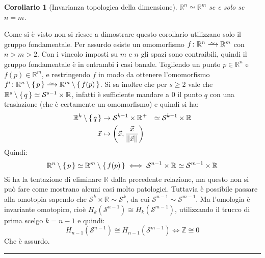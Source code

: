 \documentclass[10pt, twoside=false, x11names]{scrbook}
\newtheorem{corollary}[theorem]{Corollario}
\newenvironment{proof}{{\textbf{Dimostrazione}:}}{\hfill\rule{2mm}{2mm} \newline}
\newcommand{\Z}{\mathbb{Z}}
\newcommand{\RN}[1][]{\mathbb{R}^#1}
\newcommand{\Sph}[1][]{\mathcal{S}^#1}
\newcommand{\homoto}{\xrightarrow{\,\smash{\raisebox{-0.65ex}{\ensuremath{\scriptstyle\sim}}}\,}}
\begin{document}
\begin{corollary}[Invarianza topologica della dimensione]
  $ \RN{n} \simeq \RN{m} $ se e solo se $ n = m $.
\end{corollary}
Come si è visto non si riesce a dimostrare questo corollario
utilizzano solo il gruppo fondamentale.
\begin{proof}
  Per assurdo esiste un omomorfismo $ f \colon \RN{n} \homoto \RN{m} $ con $ n > m > 2 $.
  Con i vincolo imposti su $ m $ e $ n $ gli spazi sono contraibili, quindi il gruppo
  fondamentale è in entrambi i casi banale. Togliendo un punto $ p \in \RN{n} $ e
  $ f(p) \in \RN{m} $, e restringendo $ f $ in modo da ottenere l'omomorfismo
  $ f' \colon \RN{n} \setminus \set{p} \homoto \RN{m} \setminus \set{f(p)} $.
  Si sa inoltre che per $ s \geq 2 $ vale che $ \RN{s} \setminus \set{q} \simeq \Sph{s-1} \times \RN{} $,
  infatti è sufficiente mandare a $ 0 $ il punto $ q $ con una traslazione
  (che è certamente un omomorfismo) e quindi si ha:
  \[
    \begin{aligned}[t]
      \RN{k} \setminus \set{q} & \to  \Sph{k-1} \times {\RN{}}^+ & \simeq \Sph{k-1} \times \RN{} \\
      \vec{x} & \mapsto \left( \vec{x}, \frac{\vec{x}}{|| \vec{x} ||} \right) &
    \end{aligned}
  \]
  Quindi:
  \[
    \RN{n} \setminus \set{p} \simeq \RN{m} \setminus \set{f(p)} \iff \Sph{n-1} \times \RN{} \simeq \Sph{m-1} \times \RN{}
  \]
  Si ha la tentazione di eliminare $ \RN{} $ dalla precedente relazione, ma
  questo non si può fare come mostrano alcuni casi molto patologici.
  Tuttavia è possibile passare alla omotopia sapendo che $ \Sph{k} \times \RN{} \sim \Sph{k} $,
  da cui $ \Sph{n-1} \sim \Sph{m-1} $. Ma l'omologia è invariante omotopico, cioè
  $ H_k(\Sph{n-1}) \cong H_k(\Sph{m-1}) $, utilizzando il trucco di prima scelgo $ k = n-1 $
  e quindi:
  \[
    H_{n-1}(\Sph{n-1}) \cong H_{n-1}(\Sph{m-1}) \iff \Z \cong 0
  \]
  Che è assurdo.
\end{proof}



\printindex
\end{document}
